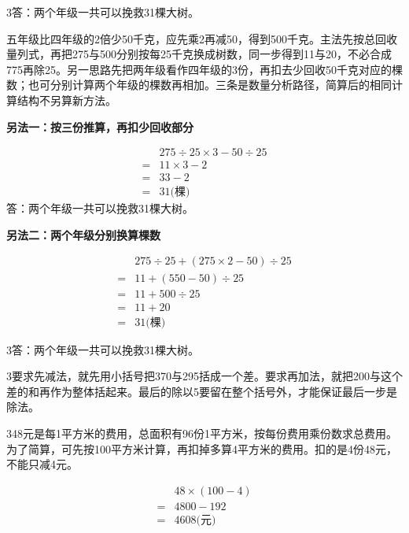 \documentclass[multi=snippet,border={5bp 20bp 5bp 5bp}]{standalone}
\newenvironment{snippet}[3]{\begin{minipage}{#1bp}\color{answerred}\fontsize{#2}{#3}\selectfont\raggedright}{\end{minipage}}
\begin{document}
\begin{snippet}{505}{11.5}{14}\begin{multicols}{3}\raggedcolumns 答：两个年级一共可以挽救31棵大树。\par 五年级比四年级的2倍少50千克，应先乘2再减50，得到500千克。主法先按总回收量列式，再把275与500分别按每25千克换成树数，同一步得到11与20，不必合成775再除25。另一思路先把两年级看作四年级的3份，再扣去少回收50千克对应的棵数；也可分别计算两个年级的棵数再相加。三条是数量分析路径，简算后的相同计算结构不另算新方法。\par \textbf{另法一：按三份推算，再扣少回收部分}\par \[\begin{aligned}&275\div25\times3-50\div25\\={}&11\times3-2\\={}&33-2\\={}&31\text{(棵)}\end{aligned}\]答：两个年级一共可以挽救31棵大树。\par \textbf{另法二：两个年级分别换算棵数}\par \end{multicols}\[\begin{aligned}&275\div25+(275\times2-50)\div25\\={}&11+(550-50)\div25\\={}&11+500\div25\\={}&11+20\\={}&31\text{(棵)}\end{aligned}\]\begin{multicols}{3}\raggedcolumns 答：两个年级一共可以挽救31棵大树。\end{multicols}\end{snippet}
\begin{snippet}{505}{11.5}{14}\begin{multicols}{3}\raggedcolumns 要求先减法，就先用小括号把370与295括成一个差。要求再加法，就把200与这个差的和再作为整体括起来。最后的除以5要留在整个括号外，才能保证最后一步是除法。\end{multicols}\end{snippet}
\begin{snippet}{505}{11.5}{14}\begin{multicols}{3}\raggedcolumns 48元是每1平方米的费用，总面积有96份1平方米，按每份费用乘份数求总费用。为了简算，可先按100平方米计算，再扣掉多算4平方米的费用。扣的是4份48元，不能只减4元。\par \[\begin{aligned}&48\times(100-4)\\={}&4800-192\\={}&4608\text{(元)}\end{aligned}\]\end{multicols}\end{snippet}
\end{document}
